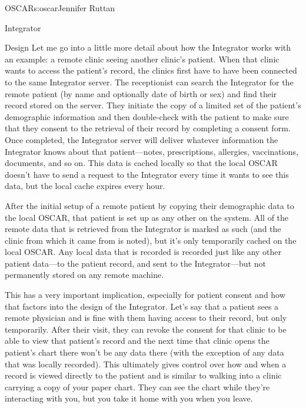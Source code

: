\begin{aosachapter}{OSCAR}{s:oscar}{Jennifer Ruttan}
\begin{aosasect1}{Integrator}
\begin{aosasect2}{Design}
Let me go into a little more detail about how the Integrator works
with an example: a remote clinic seeing another clinic's patient. When
that clinic wants to access the patient's record, the clinics first
have to have been connected to the same Integrator server. The
receptionist can search the Integrator for the remote patient (by name
and optionally date of birth or sex) and find their record stored on
the server. They initiate the copy of a limited set of the patient's
demographic information and then double-check with the patient to make
sure that they consent to the retrieval of their record by
completing a consent form. Once completed, the Integrator server will
deliver whatever information the Integrator knows about that
patient---notes, prescriptions, allergies, vaccinations, documents,
and so on. This data is cached locally so that the local OSCAR doesn't
have to send a request to the Integrator every time it wants to see
this data, but the local cache expires every hour.


After the initial setup of a remote patient by copying their
demographic data to the local OSCAR, that patient is set up as any other
on the system. All of the remote data that is retrieved from the
Integrator is marked as such (and the clinic from which it came from
is noted), but it's only temporarily cached on the local OSCAR. Any
local data that is recorded is recorded just like any other patient
data---to the patient record, and sent to the Integrator---but not
permanently stored on any remote machine.


This has a very important implication, especially for patient consent
and how that factors into the design of the Integrator. Let's say that
a patient sees a remote physician and is fine with them having access
to their record, but only temporarily. After their
visit, they can revoke the consent for that clinic to be able to view
that patient's record and the next time that clinic opens the
patient's chart there won't be any data there (with the exception of
any data that was locally recorded). This ultimately gives control
over how and when a record is viewed directly to the patient and is
similar to walking into a clinic carrying a copy of your paper
chart. They can see the chart while they're interacting with you, but
you take it home with you when you leave.


\end{aosasect2}
\end{aosasect1}
\end{aosachapter}
